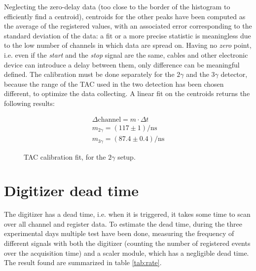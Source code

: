 \documentclass[11pt,a4 paper]{article}
\begin{document}
Neglecting the zero-delay data (too close to the border of the histogram to efficiently find a centroid), centroids for the other peaks have been computed as the average of the registered values, with an associated error corresponding to the standard deviation of the data: a fit or a more precise statistic is meaningless due to the low number of channels in which data are spread on. Having no \emph{zero} point, i.e. even if the \emph{start} and the \emph{stop} signal are the same, cables and other electronic device can introduce a delay between them, only difference can be meaningful defined. The calibration must be done separately for the $2\gamma$ and the $3\gamma$ detector, because the range of the TAC used in the two detection has been chosen different, to optimize the data collecting. A linear fit on the centroids returns the following results:

\begin{gather*}
    \Delta\text{channel}  = m \cdot \Delta t \\
    m_{2\gamma} = ( 117 \pm 1 )\si{\per\nano\second} \\
    m_{3\gamma} = ( 87.4 \pm 0.4 )\si{\per\nano\second}
\end{gather*}

\begin{figure}[H]
    \centering
    \caption{TAC calibration fit, for the $2\gamma$ setup.}
    \label{fig:tac_calibr_fit}
\end{figure}



\section{Digitizer dead time}
The digitizer has a dead time, i.e. when it is triggered, it takes some time to scan over all channel and register data. To estimate the dead time, during the three experimental days multiple test have been done, measuring the frequency of different signals with both the digitizer (counting the number of registered events over the acquisition time) and a scaler module, which has a negligible dead time. The result found are summarized in table \ref{tab:rate}.
\end{document}
